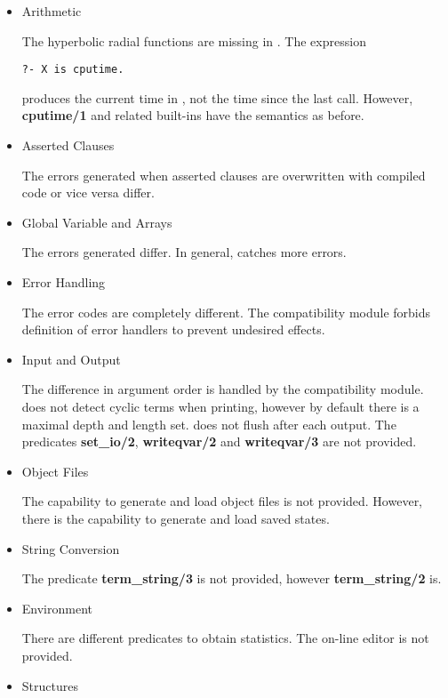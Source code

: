 \begin{itemize}

\item{Arithmetic}

The hyperbolic radial functions are missing in \eclipse. The 
expression 
\begin{verbatim}
?- X is cputime.
\end{verbatim}
produces the current time in \eclipse, not the time since the
last call. However, {\bf cputime/1} and related built-ins 
have the semantics as before.

\item{Asserted Clauses}

The errors generated when asserted clauses are overwritten with compiled
code or vice versa differ.

\item{Global Variable and Arrays}

The errors generated differ. In general, \eclipse catches more
errors.

\item{Error Handling}

The error codes are completely different. The compatibility module
forbids definition of error handlers to prevent undesired effects.

\item{Input and Output}

The difference in argument order is handled by the compatibility module.
\eclipse does not detect cyclic terms when printing, however by
default there is a maximal depth and length set. \eclipse does
not flush after each output. The predicates {\bf set\_io/2},
{\bf writeqvar/2} and {\bf writeqvar/3} are not provided.

\item{Object Files}

The capability to generate and load object files is not provided.
However, there is the capability to generate and load saved states.

\item{String Conversion}

The predicate {\bf term\_string/3} is not provided, however
{\bf term\_string/2} is.

\item{Environment}

There are different predicates to
obtain statistics. The on-line editor is not provided.

\item{Structures}


\end{itemize}
